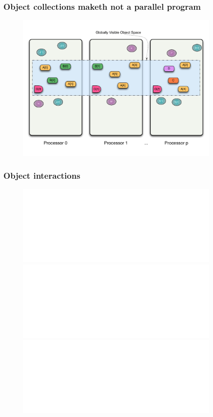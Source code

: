 \begin{frame}
  \frametitle{Object collections maketh not a parallel program}
  \begin{figure}
	\includegraphics[width=0.9\textwidth]{../figures/progmodel/07-obj-programmer-view.pdf}
  \end{figure}
\end{frame}


\begin{frame}
  \frametitle{Object interactions }
  \begin{figure}
	\includegraphics<1>[width=0.9\textwidth]{../figures/progmodel/05-parallelism-via-obj-collections.pdf}
	\includegraphics<2>[width=0.9\textwidth]{../figures/progmodel/08-seq-obj-methods.pdf}
	\includegraphics<3>[width=0.9\textwidth]{../figures/progmodel/09-rmi-synchronous.pdf}
  \end{figure}
\end{frame}


